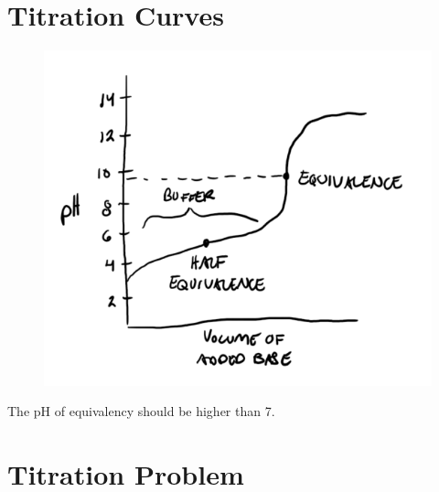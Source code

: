 \documentclass{article}
\begin{document}
\section{Titration Curves}
\begin{figure}[H]
    \centering
    \includegraphics[scale=1]{"Figure 1"}
\end{figure}

The pH of equivalency should be higher than 7.

\section{Titration Problem}
\end{document}
